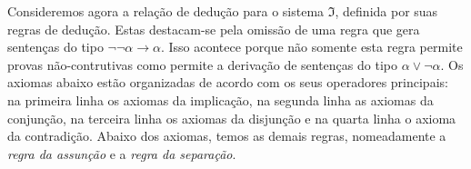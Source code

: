 \vspace{0.5\baselineskip}
Consideremos agora a relação de dedução para o sistema $\mathfrak{I}$, definida por suas regras de dedução.
Estas destacam-se pela omissão de uma regra que gera sentenças do tipo $\neg\neg\alpha\to\alpha$.
Isso acontece porque não somente esta regra permite provas não-contrutivas como permite a derivação de sentenças do tipo $\alpha\vee\neg\alpha$.
Os axiomas abaixo estão organizadas de acordo com os seus operadores principais: na primeira linha os axiomas da implicação, na segunda linha as axiomas da conjunção, na terceira linha os axiomas da disjunção e na quarta linha o axioma da contradição.
Abaixo dos axiomas, temos as demais regras, nomeadamente a \emph{regra da assunção} e a \emph{regra da separação}.

\vspace{0.5\baselineskip}
